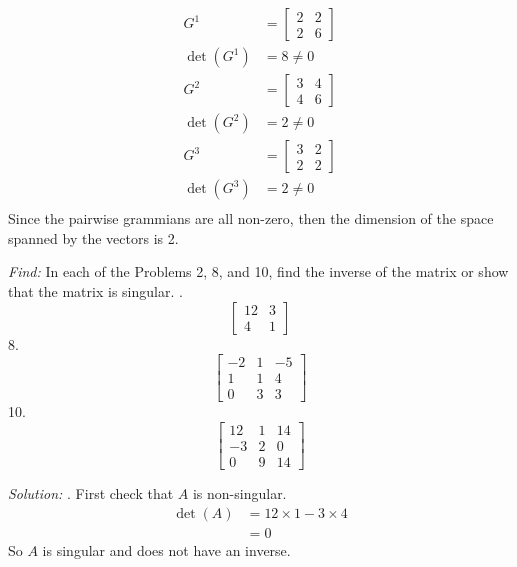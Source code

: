 \documentclass[11pt]{homework}
\begin{document}
\begin{align*}
G^1 &= 
  \begin{bmatrix}
  2 & 2 \\
  2 & 6
  \end{bmatrix} \\
\det (G^1) &= 8 \neq 0 \\
G^2 &= 
  \begin{bmatrix}
  3 & 4 \\
  4 & 6
  \end{bmatrix} \\
\det (G^2) &= 2 \neq 0 \\
G^3 &= 
  \begin{bmatrix}
  3 & 2 \\
  2 & 2
  \end{bmatrix} \\
\det (G^3) &= 2 \neq 0 \\
\end{align*}
Since the pairwise grammians are all non-zero, 
then the dimension of the space spanned by the vectors is 2.

\emph{Find:}
In each of the Problems 2, 8, and 10, 
find the inverse of the matrix or
show that the matrix is singular.
.
\begin{equation*}
  \begin{bmatrix}
  12 & 3 \\
  4  & 1 
  \end{bmatrix}
\end{equation*}
8. 
\begin{equation*}
  \begin{bmatrix}
  -2 & 1 & -5 \\
   1 & 1 & 4 \\
   0 & 3 & 3
  \end{bmatrix}
\end{equation*}
10.
\begin{equation*}
  \begin{bmatrix}
  12 & 1 & 14 \\
  -3 & 2 & 0 \\
   0 & 9 & 14 
  \end{bmatrix}
\end{equation*}

\emph{Solution:}
. First check that $A$ is non-singular.
\begin{align*}
  \det (A) &= 12 \times 1 - 3 \times 4 \\
           &= 0
\end{align*}
So $A$ is singular and does not have an inverse.
\end{document}
